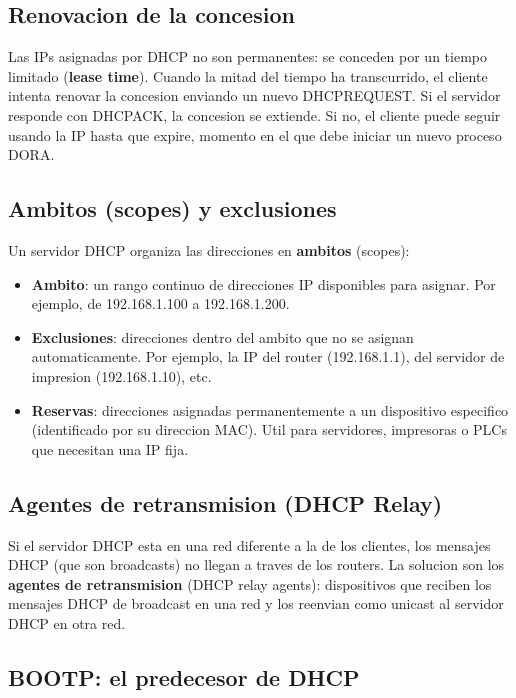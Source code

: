 \subsection{Renovacion de la concesion}

Las IPs asignadas por DHCP no son permanentes: se conceden por un tiempo
limitado (\textbf{lease time}). Cuando la mitad del tiempo ha transcurrido, el
cliente intenta renovar la concesion enviando un nuevo DHCPREQUEST. Si el
servidor responde con DHCPACK, la concesion se extiende. Si no, el cliente
puede seguir usando la IP hasta que expire, momento en el que debe iniciar un
nuevo proceso DORA.

\subsection{Ambitos (scopes) y exclusiones}

Un servidor DHCP organiza las direcciones en \textbf{ambitos} (scopes):

\begin{itemize}
    \item \textbf{Ambito}: un rango continuo de direcciones IP disponibles para
    asignar. Por ejemplo, de 192.168.1.100 a 192.168.1.200.
    \item \textbf{Exclusiones}: direcciones dentro del ambito que no se asignan
    automaticamente. Por ejemplo, la IP del router (192.168.1.1), del servidor
    de impresion (192.168.1.10), etc.
    \item \textbf{Reservas}: direcciones asignadas permanentemente a un dispositivo
    especifico (identificado por su direccion MAC). Util para servidores,
    impresoras o PLCs que necesitan una IP fija.
\end{itemize}

\subsection{Agentes de retransmision (DHCP Relay)}

Si el servidor DHCP esta en una red diferente a la de los clientes, los mensajes
DHCP (que son broadcasts) no llegan a traves de los routers. La solucion son los
\textbf{agentes de retransmision} (DHCP relay agents): dispositivos que reciben los
mensajes DHCP de broadcast en una red y los reenvian como unicast al servidor
DHCP en otra red.

\subsection{BOOTP: el predecesor de DHCP}

